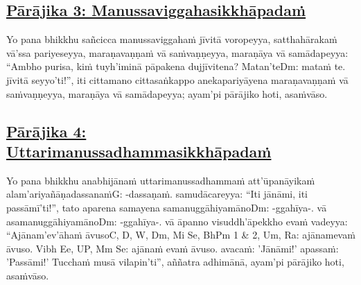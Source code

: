 \subsection*{\hyperref[disq3]{Pārājika 3: Manussaviggahasikkhāpadaṁ}}
\label{par3}

Yo pana bhikkhu sañcicca manussaviggahaṁ jīvitā voropeyya, satthahārakaṁ vā'ssa pariyeseyya, maraṇavaṇṇaṁ vā saṁvaṇṇeyya, maraṇāya vā samādapeyya: ``Ambho purisa, kiṁ tuyh'iminā pāpakena dujjīvitena? Matan'te\makeatletter\hyperlink{endnote-appendix}\makeatother Dm: mataṁ te. jīvitā seyyo'ti!'', iti cittamano cittasaṅkappo anekapariyāyena maraṇavaṇṇaṁ vā saṁvaṇṇeyya, maraṇāya vā samādapeyya; ayam'pi pārājiko hoti, asaṁvāso.



\subsection*{\hyperref[disq4]{Pārājika 4: Uttarimanussadhammasikkhāpadaṁ}}

\label{par4}

Yo pana bhikkhu anabhijānaṁ uttarimanussadhammaṁ att'ūpanāyikaṁ alam'ariyañāṇadassanaṁ\makeatletter\hyperlink{endnote-appendix}\makeatother G: -dassaṇaṁ. samudācareyya: ``Iti jānāmi, iti passāmī'ti!'', tato aparena samayena samanuggāhiyamāno\makeatletter\hyperlink{endnote-appendix}\makeatother Dm: -ggahīya-.  vā asamanuggāhiyamāno\makeatletter\hyperlink{endnote-appendix}\makeatother Dm: -ggahīya-.  vā āpanno visuddh'āpekkho evaṁ vadeyya: ``Ajānam'ev'āhaṁ āvuso\makeatletter\hyperlink{endnote-appendix}\makeatother C, D, W, Dm, Mi Se, BhPm 1 & 2, Um, Ra: ajānamevaṁ āvuso. Vibh Ee, UP, Mm Se: ajānaṁ evaṁ āvuso.  avacaṁ: 'Jānāmi!' apassaṁ: 'Passāmi!' Tucchaṁ musā vilapin'ti'', aññatra adhimānā, ayam'pi pārājiko hoti, asaṁvāso.



